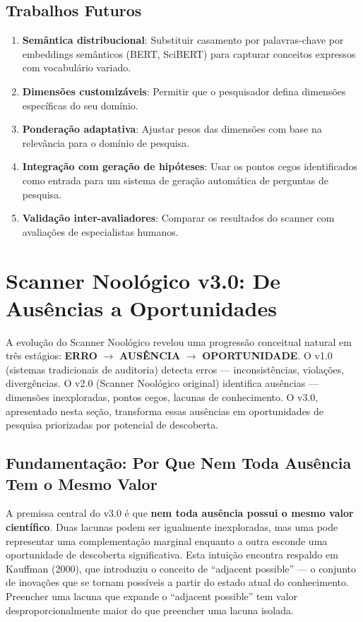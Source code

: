 \documentclass[12pt,a4paper]{article}
\begin{document}
\subsection{Trabalhos Futuros}

\begin{enumerate}[itemsep=1pt]
  \item \textbf{Semântica distribucional}: Substituir casamento por palavras-chave por embeddings semânticos (BERT, SciBERT) para capturar conceitos expressos com vocabulário variado.
  \item \textbf{Dimensões customizáveis}: Permitir que o pesquisador defina dimensões específicas do seu domínio.
  \item \textbf{Ponderação adaptativa}: Ajustar pesos das dimensões com base na relevância para o domínio de pesquisa.
  \item \textbf{Integração com geração de hipóteses}: Usar os pontos cegos identificados como entrada para um sistema de geração automática de perguntas de pesquisa.
  \item \textbf{Validação inter-avaliadores}: Comparar os resultados do scanner com avaliações de especialistas humanos.
\end{enumerate}

\section{Scanner Noológico v3.0: De Ausências a Oportunidades}

A evolução do Scanner Noológico revelou uma progressão conceitual natural em três estágios: \textbf{ERRO} $\rightarrow$ \textbf{AUSÊNCIA} $\rightarrow$ \textbf{OPORTUNIDADE}. O v1.0 (sistemas tradicionais de auditoria) detecta erros --- inconsistências, violações, divergências. O v2.0 (Scanner Noológico original) identifica ausências --- dimensões inexploradas, pontos cegos, lacunas de conhecimento. O v3.0, apresentado nesta seção, transforma essas ausências em oportunidades de pesquisa priorizadas por potencial de descoberta.

\subsection{Fundamentação: Por Que Nem Toda Ausência Tem o Mesmo Valor}

A premissa central do v3.0 é que \textbf{nem toda ausência possui o mesmo valor científico}. Duas lacunas podem ser igualmente inexploradas, mas uma pode representar uma complementação marginal enquanto a outra esconde uma oportunidade de descoberta significativa. Esta intuição encontra respaldo em Kauffman (2000), que introduziu o conceito de ``adjacent possible'' --- o conjunto de inovações que se tornam possíveis a partir do estado atual do conhecimento. Preencher uma lacuna que expande o ``adjacent possible'' tem valor desproporcionalmente maior do que preencher uma lacuna isolada.
\end{document}
